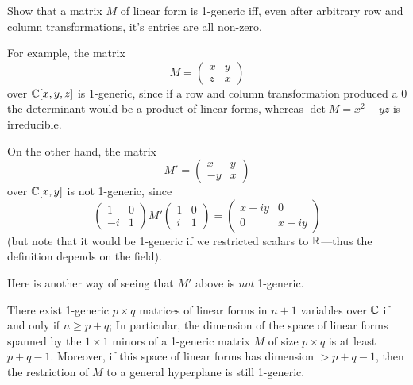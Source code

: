 \begin{exercise}
Show that a matrix $M$ of linear form is 1-generic iff, even after arbitrary row and column transformations, it's entries are all non-zero.
\end{exercise}
 For example, the matrix 
$$
M = \begin{pmatrix}
 x &y\\
 z&x
\end{pmatrix}
$$
over $\CC[x,y,z]$ is  1-generic, since if a row and column transformation produced a 0 the determinant would be a product of linear forms, whereas
$\det M = x^2-yz$ is irreducible. 

On the other hand, the matrix
$$
M' = \begin{pmatrix}
 x &y\\
 -y&x
\end{pmatrix}
$$
over $\CC[x,y]$ is not 1-generic, since
$$
\begin{pmatrix}
1&0\\
-i&1 
\end{pmatrix}
M'
\begin{pmatrix}
 1&0\\
 i&1
\end{pmatrix}
= 
\begin{pmatrix}
 x+iy&0\\
 0&x-iy
\end{pmatrix}
$$
(but note that it would be 1-generic if we restricted scalars to $\RR$---thus the definition depends on the field).

Here is another way of seeing that $M'$ above is \emph{not} 1-generic.

\begin{lemma} \label{size of 1-generic} There exist 1-generic $p\times q$ matrices of linear forms in $n+1$ variables over $\CC$ if and only if $n\geq p+q$;
In particular, the dimension of the space of linear forms spanned by the $1\times 1$ minors of a  1-generic matrix $M$ of size $p\times q$ is at least $p+q-1$. Moreover, if this space of linear forms has dimension $>p+q-1$, then the restriction of $M$ to a general hyperplane is still 1-generic.
\end{lemma}

